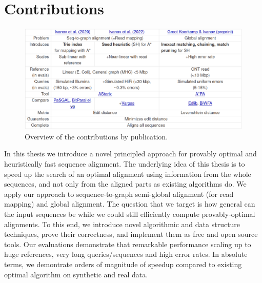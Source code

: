 \section*{Contributions}

\begin{figure}[t]
  \includegraphics[width=1.0\linewidth]{media/ownpubs-table.png}
  \caption[Overview of the contributions by publication]{Overview of the contributions by publication.}
  \label{tab:ownpubs}
\end{figure}

In this thesis we introduce a novel principled approach for provably optimal and
heuristically fast sequence alignment. The underlying idea of this thesis is to
speed up the search of an optimal alignment using information from the whole
sequences, and not only from the aligned parts as existing algorithms do. We
apply our approach to sequence-to-graph semi-global alignment (for read mapping)
and global alignment. The question that we target is how general can the input
sequences be while we could still efficiently compute provably-optimal
alignments. To this end, we introduce novel algorithmic and data structure
techniques, prove their correctness, and implement them as free and open source
tools. Our evaluations demonstrate that remarkable performance scaling up to
huge references, very long queries/sequences and high error rates. In absolute
terms, we demontrate orders of magnitude of speedup compared to existing optimal
algorithm on synthetic and real data.


